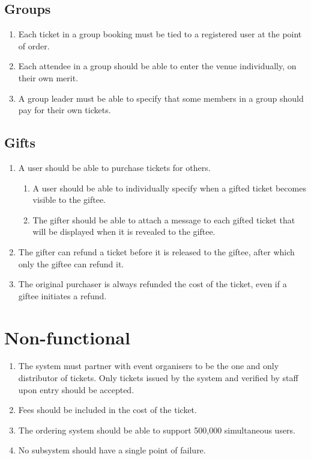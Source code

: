 \documentclass[12pt,a4paper]{bhamdissertation}
\begin{document}
\subsection{Groups}

\begin{enumerate}[resume]
    \item Each ticket in a group booking must be tied to a registered user at the point of order.
    \item Each attendee in a group should be able to enter the venue individually, on their own merit.
    \item A group leader must be able to specify that some members in a group should pay for their own tickets.
\end{enumerate}

\subsection{Gifts}

\begin{enumerate}[resume]
    \item A user should be able to purchase tickets for others.
    \begin{enumerate}
        \item A user should be able to individually specify when a gifted ticket becomes visible to the giftee.
        \item The gifter should be able to attach a message to each gifted ticket that will be displayed when it is revealed to the giftee.
    \end{enumerate}
    \item The gifter can refund a ticket before it is released to the giftee, after which only the giftee can refund it.
    \item The original purchaser is always refunded the cost of the ticket, even if a giftee initiates a refund.
\end{enumerate}

\section{Non-functional}

\begin{enumerate}[resume]
    \item The system must partner with event organisers to be the one and only distributor of tickets. Only tickets issued by the system and verified by staff upon entry should be accepted.
    \item Fees should be included in the cost of the ticket.
    \item The ordering system should be able to support 500,000 simultaneous users.
    \item No subsystem should have a single point of failure.
\end{enumerate}
\end{document}

